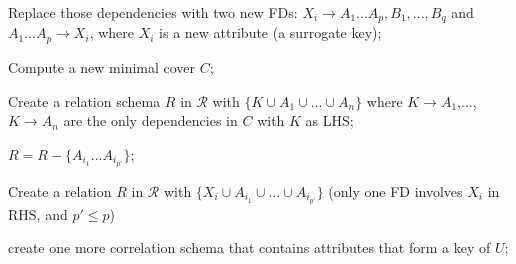 \DontPrintSemicolon




{

Replace those dependencies with two new FDs: $X_i \to  A_1...A_p,B_1,...,B_q$ and $ A_1...A_p \to X_i$, where $X_i$ is a new attribute (a surrogate key);

}


Compute a new minimal cover $C$;

{
Create a relation schema $R$  in $\mathcal{R}$ with $\{K \cup A_1 \cup ... \cup A_n\}$ where $K \to A_1$,..., $K \to A_n$ are the only dependencies in $C$ with $K$ as LHS;

    { 
           $R = R -  \{A_{i_1}...A_{i_{p'}}\}$;
    } 
}

{
Create a relation $R$ in $\mathcal{R}$ with $\{X_i \cup A_{i_1} \cup ... \cup A_{i_{p'}}\}$ (only one FD involves $X_i$ in RHS, and $p' \leq p$)
}





    { 
           create one more correlation schema that contains attributes that form a key of $U$;
    } 

